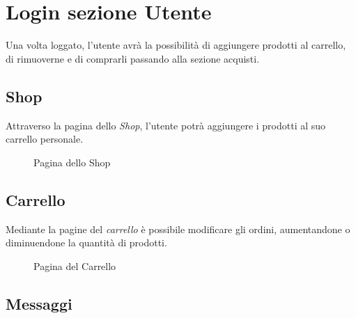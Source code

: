 \documentclass[a4paper,12pt]{report}
\begin{document}
	
	\newpage
	
	\section{Login sezione Utente}
	
	\textsf{\small Una volta loggato, l'utente avrà la possibilità di aggiungere prodotti al carrello, di rimuoverne e di comprarli passando alla sezione acquisti.}\\
	
	
	\subsection{Shop}
	
	\textsf{\small Attraverso la pagina dello \emph{Shop}, l'utente potrà aggiungere i prodotti al suo carrello personale.}\\
	
	\begin{figure}[H] 
		\centering
		\caption{Pagina dello Shop}
		\label{fig:shop}
	\end{figure}
	
	
	\subsection{Carrello}
	
	\textsf{\small Mediante la pagine del \emph{carrello} è possibile modificare gli ordini, aumentandone o diminuendone la quantità di prodotti.}\\
	
	\begin{figure}[H] 
		\centering
		\caption{Pagina del Carrello}
		\label{fig:carrello}
	\end{figure}
	
	
	\subsection{Messaggi}
	
\end{document}
